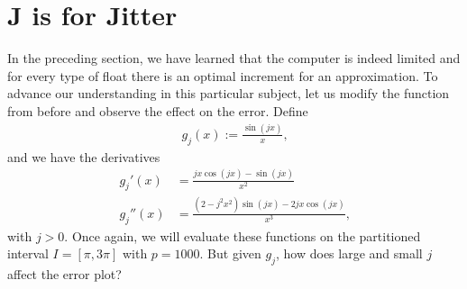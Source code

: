 \section{J is for Jitter}

In the preceding section, we have learned that the computer is indeed limited and for every type of float there is an optimal increment for an approximation. To advance our understanding in this particular subject, let us modify the function from before and observe the effect on the error. Define
\begin{align*}
    g_j(x) := \frac{\sin(j x)}{x} \text{,}
\end{align*}
and we have the derivatives
\begin{align*}
    g_j'(x) &= \frac{j x \cos(jx) - \sin(jx)}{x^2} \\
    g_j''(x) &= \frac{(2 - j^2 x^2)\sin(jx) - 2 j x \cos(jx)}{x^3} \text{,}
\end{align*}
with \(j > 0\). Once again, we will evaluate these functions on the partitioned interval \(I = [\pi, 3\pi]\) with \(p = 1000\). But given \(g_j\), how does large and small \(j\) affect the error plot?